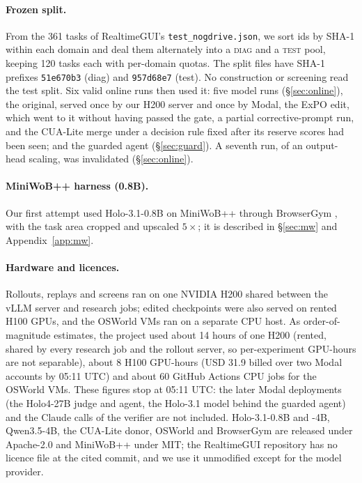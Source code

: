 \paragraph{Frozen split.} From the 361 tasks of RealtimeGUI's \texttt{test\_nogdrive.json}, we sort ids by SHA-1 within each domain and deal them alternately into a \textsc{diag} and a \textsc{test} pool, keeping 120 tasks each with per-domain quotas. The split files have SHA-1 prefixes \texttt{51e670b3} (diag) and \texttt{957d68e7} (test). No construction or screening read the test split. Six valid online runs then used it: five model runs (\S\ref{sec:online}), the original, served once by our H200 server and once by Modal, the ExPO edit, which went to it without having passed the gate, a partial corrective-prompt run, and the CUA-Lite merge under a decision rule fixed after its reserve scores had been seen; and the guarded agent (\S\ref{sec:guard}). A seventh run, of an output-head scaling, was invalidated (\S\ref{sec:online}). %

\paragraph{MiniWoB++ harness (0.8B).} Our first attempt used Holo-3.1-0.8B on MiniWoB++ \citep{shi2017wob,liu2018miniwob} through BrowserGym \citep{browsergym2024}, with the task area cropped and upscaled $5\times$; it is described in \S\ref{sec:mw} and Appendix~\ref{app:mw}.

\paragraph{Hardware and licences.} Rollouts, replays and screens ran on one NVIDIA H200 shared between the vLLM server and research jobs; edited checkpoints were also served on rented H100 GPUs, and the OSWorld VMs ran on a separate CPU host. As order-of-magnitude estimates, the project used about 14 hours of one H200 (rented, shared by every research job and the rollout server, so per-experiment GPU-hours are not separable), about 8 H100 GPU-hours (USD 31.9 billed over two Modal accounts by 05:11 UTC) and about 60 GitHub Actions CPU jobs for the OSWorld VMs. These figures stop at 05:11 UTC: the later Modal deployments (the Holo4-27B judge and agent, the Holo-3.1 model behind the guarded agent) and the Claude calls of the verifier are not included. %
Holo-3.1-0.8B and -4B, Qwen3.5-4B, the CUA-Lite donor, OSWorld and BrowserGym are released under Apache-2.0 and MiniWoB++ under MIT; the RealtimeGUI repository has no licence file at the cited commit, and we use it unmodified except for the model provider. %

